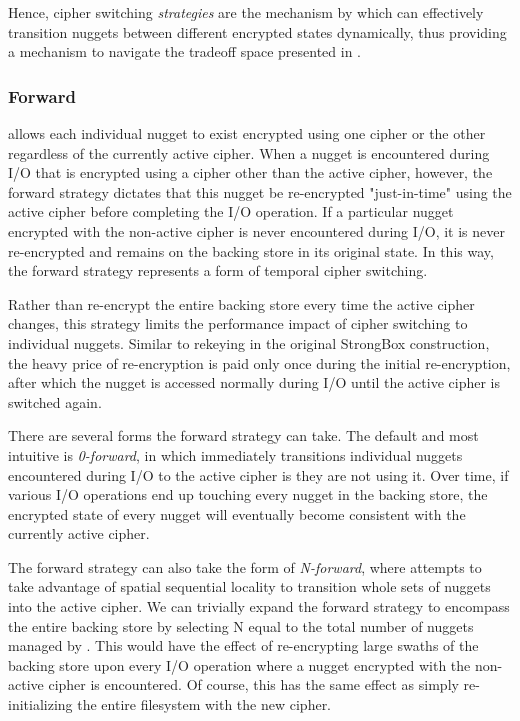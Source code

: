 {Hence, cipher switching \emph{strategies} are the mechanism by which \SYSTEM{}
can effectively transition nuggets between different encrypted states
dynamically, thus providing a mechanism to navigate the tradeoff space presented
in .  

\subsubsection{Forward}

\SYSTEM{} allows each individual nugget to exist encrypted using one cipher or
the other regardless of the currently active cipher. When a nugget is
encountered during I/O that is encrypted using a cipher other than the active
cipher, however, the forward strategy dictates that this nugget be re-encrypted
"just-in-time" using the active cipher before completing the I/O operation. If a
particular nugget encrypted with the non-active cipher is never encountered
during I/O, it is never re-encrypted and remains on the backing store in its
original state. In this way, the forward strategy represents a form of temporal
cipher switching.

Rather than re-encrypt the entire backing store every time the active cipher
changes, this strategy limits the performance impact of cipher switching to
individual nuggets. Similar to rekeying in the original StrongBox construction,
the heavy price of re-encryption is paid only once during the initial
re-encryption, after which the nugget is accessed normally during I/O until the
active cipher is switched again.

There are several forms the forward strategy can take. The default and most
intuitive is \emph{0-forward}, in which \SYSTEM{} immediately transitions
individual nuggets encountered during I/O to the active cipher is they are not
using it. Over time, if various I/O operations end up touching every nugget in
the backing store, the encrypted state of every nugget will eventually become
consistent with the currently active cipher.

The forward strategy can also take the form of \emph{N-forward}, where \SYSTEM{}
attempts to take advantage of spatial sequential locality to transition whole
sets of nuggets into the active cipher. We can trivially expand the forward
strategy to encompass the entire backing store by selecting N equal to the total
number of nuggets managed by \SYSTEM{}. This would have the effect of
re-encrypting large swaths of the backing store upon every I/O operation where a
nugget encrypted with the non-active cipher is encountered. Of course, this has
the same effect as simply re-initializing the entire filesystem with the new
cipher.

}
